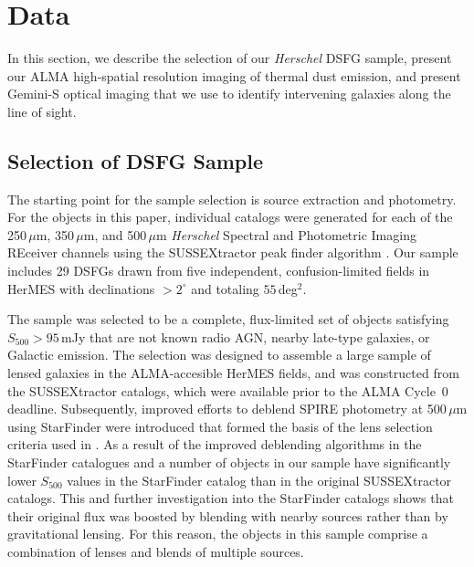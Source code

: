 \documentclass[iop]{emulateapj}
\begin{document}
\section{Data}\label{sec:obs}

In this section, we describe the selection of our {\it Herschel} DSFG sample,
present our ALMA high-spatial resolution imaging of thermal dust emission, and
present Gemini-S optical imaging that we use to identify intervening galaxies
along the line of sight.  

\subsection{Selection of DSFG Sample}\label{sec:select}

The starting point for the sample selection is source extraction and
photometry.  For the objects in this paper, individual catalogs were generated
for each of the 250$\, \mu$m, 350$\,\mu$m, and 500$\,\mu$m {\it Herschel}
Spectral and Photometric Imaging REceiver \citep[SPIRE;][]{2010A&A...518L...3G}
channels using the SUSSEXtractor peak finder algorithm \citep{Savage:2007sf}.
Our sample includes 29 DSFGs drawn from five independent, confusion-limited
fields in HerMES with declinations $> 2 ^\circ$ and totaling $55\,$deg$^2$.

The sample was selected to be a complete, flux-limited set of objects
satisfying $S_{500} > 95\,$mJy that are not known radio AGN, nearby late-type
galaxies, or Galactic emission. The selection was designed to assemble a large
sample of lensed galaxies in the ALMA-accesible HerMES fields, and was
constructed from the SUSSEXtractor catalogs, which were available prior to the
ALMA Cycle~0 deadline.  Subsequently, improved efforts to deblend SPIRE
photometry at 500$\,\mu$m using StarFinder \citep{Wang:2014lr} were introduced
that formed the basis of the lens selection criteria used in
\citet{Wardlow:2013lr}.  As a result of the improved deblending algorithms in
the StarFinder catalogues and \citet{Wardlow:2013lr} a number of objects in our
sample have significantly lower $S_{500}$ values in the StarFinder catalog than
in the original SUSSEXtractor catalogs.  This and further investigation into
the StarFinder catalogs shows that their original flux was boosted by blending
with nearby sources rather than by gravitational lensing.  For this reason, the
objects in this sample comprise a combination of lenses and blends of multiple
sources.
\end{document}
